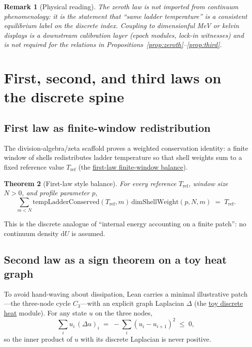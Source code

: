 \documentclass[11pt]{amsart}
\newtheorem{theorem}{Theorem}[section]
\newtheorem{remark}[theorem]{Remark}
\begin{document}
\begin{remark}[Physical reading]
The zeroth law is not imported from continuum phenomenology: it is the statement that
``same ladder temperature'' is a consistent equilibrium label on the discrete index.
Coupling to dimensionful MeV or kelvin displays is a downstream calibration layer
(epoch modules, lock-in witnesses) and is not required for the relations in
Propositions~\ref{prop:zeroth}--\ref{prop:third}.
\end{remark}

\section{First, second, and third laws on the discrete spine}
\label{sec:laws}

\subsection{First law as finite-window redistribution}

The division-algebra/zeta scaffold proves a weighted conservation identity: a finite
window of shells redistributes ladder temperature so that shell weights sum to a fixed
reference value $T_{\mathrm{ref}}$ (the \hyperref[lean:first-law]{first-law finite-window balance}).

\begin{theorem}[First-law style balance]
\label{thm:first}
For every reference $T_{\mathrm{ref}}$, window size $N>0$, and profile parameter $p$,
\[
  \sum_{m<N} \mathrm{tempLadderConserved}(T_{\mathrm{ref}},m)\,
  \mathrm{dimShellWeight}(p,N,m)
  \;=\; T_{\mathrm{ref}}.
\]
\end{theorem}

This is the discrete analogue of ``internal energy accounting on a finite patch'': no
continuum density $\mathrm{d}U$ is assumed.

\subsection{Second law as a sign theorem on a toy heat graph}

To avoid hand-waving about dissipation, Lean carries a minimal illustrative patch---the
three-node cycle $C_3$---with an explicit graph Laplacian $\Delta$ (the
\hyperref[lean:toy-heat]{toy discrete heat} module). For any state $u$ on the three nodes,
\[
  \sum_i u_i\,(\Delta u)_i \;=\; -\sum_i (u_i-u_{i+1})^2 \;\le\; 0,
\]
so the inner product of $u$ with its discrete Laplacian is never positive.
\end{document}
